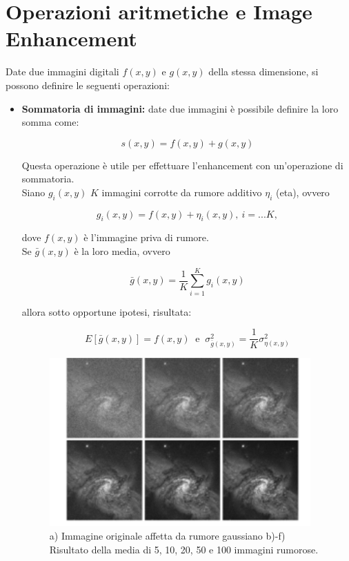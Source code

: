 \section{Operazioni aritmetiche e Image Enhancement}

Date due immagini digitali $f(x,y)$ e $g(x,y)$ della stessa dimensione, si
possono definire le seguenti operazioni:


\begin{itemize}
    \item \textbf{Sommatoria di immagini:}
          date due immagini è possibile definire la loro somma come:

          $$
              s(x,y) = f(x,y) + g(x,y)
          $$

          Questa operazione è utile per effettuare l'enhancement con
          un'operazione di sommatoria.\\

          Siano $g_i(x,y)$ $K$ immagini corrotte da rumore additivo $\eta_i$ (eta),
          ovvero

          $$
              g_i(x,y) = f(x,y) + \eta_i(x,y), \ i=...K,
          $$

          dove $f(x,y)$ è l'immagine priva di rumore.\\
          Se $\bar{g}(x,y)$ è la loro media, ovvero

          $$
              \bar{g}(x,y)=\frac{1}{K} \sum_{i=1}^{K}g_i(x,y)
          $$

          allora sotto opportune ipotesi, risultata:

          $$
              E\left[\bar{g}(x,y)\right] = f(x,y) \ \text{ e } \ \sigma^2_{\bar{g}(x,y)}=\frac{1}{K}\sigma^2_{\eta(x,y)}
          $$

          \begin{figure}[H]
              \centering
              \includegraphics[width=10cm, keepaspectratio]{capitoli/immagini/imgs/sommatoria-immagini.png}
              \caption{a) Immagine originale affetta da rumore gaussiano
                  b)-f) Risultato della media di 5, 10, 20, 50 e 100 immagini
                  rumorose.}
          \end{figure}


\end{itemize}
